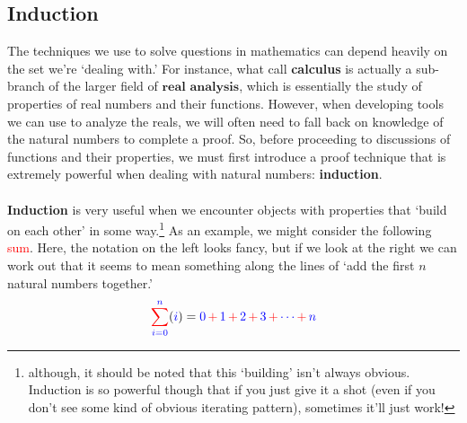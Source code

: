 \documentclass[10pt]{article}
\theoremstyle{definition}
\begin{document}
\subsection{Induction}
The techniques we use to solve questions in mathematics can depend heavily on the set we're `dealing with.'  For instance, what call \textbf{calculus} is actually a sub-branch of the larger field of $\textbf{real analysis}$, which is essentially the study of properties of real numbers and their functions.  However, when developing tools we can use to analyze the reals, we will often need to fall back on knowledge of the natural numbers to complete a proof.  So, before proceeding to discussions of functions and their properties, we must first introduce a proof technique that is extremely powerful when dealing with natural numbers: \textbf{induction}.\\~\\
\textbf{Induction} is very useful when we encounter objects with properties that `build on each other' in some way.\footnote{although, it should be noted that this `building' isn't always obvious.  Induction is so powerful though that if you just give it a shot (even if you don't see some kind of obvious iterating pattern), sometimes it'll just work!}  As an example, we might consider the following \textcolor{red}{sum}.  Here, the notation on the left looks fancy, but if we look at the right we can work out that it seems to mean something along the lines of `add the first $n$ natural numbers together.'  %
\[{\color{red}\sum^{{\color{blue}n}}_{\color{blue} i=0}} ({\color{blue}i}) = \textcolor{blue}{0} \,{\color{red}+}\,\textcolor{blue}{1} \,{\color{red}+}\, \textcolor{blue}{2} \,{\color{red}+}\, \textcolor{blue}{3} \,{\color{red}+}\, \textcolor{blue}{\cdots} \,{\color{red}+}\, \textcolor{blue}{n}\]
\end{document}
